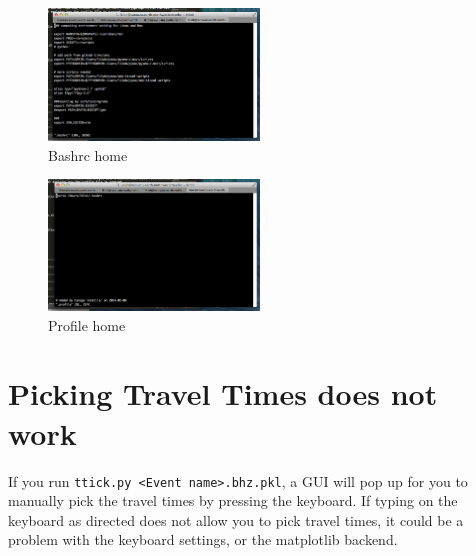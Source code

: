 \documentclass[letterpaper,10pt]{article}
\begin{document}
\begin{figure}[h!]
  \centering
  \includegraphics[width=0.5\textwidth]{images/bashrc_home}
  \caption{Bashrc home}
  \label{fig:bashrc_home}
\end{figure}

\begin{figure}[h!]
  \centering
  \includegraphics[width=0.5\textwidth]{images/profile_home}
  \caption{Profile home}
  \label{fig:profile_home}
\end{figure}




\section{Picking Travel Times does not work}

If you run \verb"ttick.py <Event name>.bhz.pkl", a GUI will pop up for you to manually pick the travel times by pressing the keyboard. If typing on the keyboard as directed does not allow you to pick travel times, it could be a problem with the keyboard settings, or the matplotlib backend. 
\end{document}
